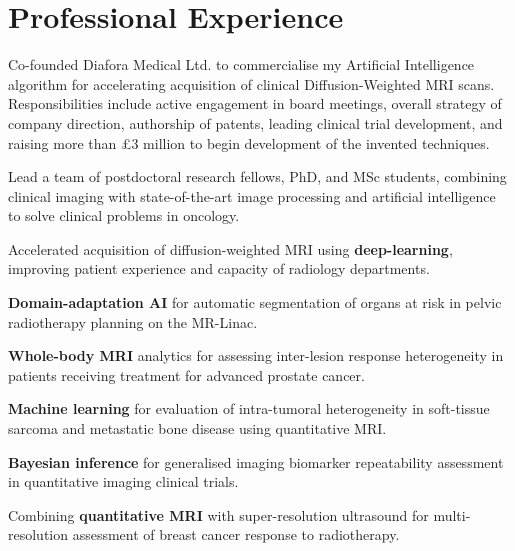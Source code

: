 \documentclass[]{mbcv}
\begin{document}
\begin{minipage}[t]{0.65\textwidth}

\section{Professional Experience}
Co-founded Diafora Medical Ltd. to commercialise my Artificial Intelligence algorithm for accelerating acquisition of clinical Diffusion-Weighted MRI scans. Responsibilities include active engagement in board meetings, overall strategy of company direction, authorship of patents, leading clinical trial development, and raising more than £3 million to begin development of the invented techniques.

\vspace{10pt}

Lead a team of postdoctoral research fellows,  PhD, and MSc students, combining clinical imaging with state-of-the-art image processing and artificial intelligence to solve clinical problems in oncology.
 
\vspace*{20pt}
\begin{tightemize}
\item Accelerated acquisition of diffusion-weighted MRI using \textbf{deep-learning}, improving patient experience and capacity of radiology departments.
\item \textbf{Domain-adaptation AI} for automatic segmentation of organs at risk in pelvic radiotherapy planning on the MR-Linac.
\item \textbf{Whole-body MRI} analytics for assessing inter-lesion response heterogeneity in patients receiving treatment for advanced prostate cancer.
\item \textbf{Machine learning} for evaluation of intra-tumoral heterogeneity in soft-tissue sarcoma and metastatic bone disease using quantitative MRI.
\item \textbf{Bayesian inference} for generalised imaging biomarker repeatability assessment in quantitative imaging clinical trials.
\item Combining \textbf{quantitative MRI} with super-resolution ultrasound for multi-resolution assessment of breast cancer response to radiotherapy.
\end{tightemize}


\end{minipage}
\end{document}
